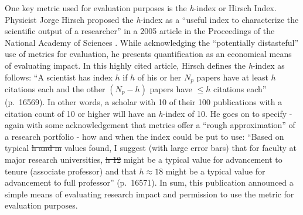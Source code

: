 \documentclass[
  10pt,
  letterpaper,
]{article}
\providecommand{\DIFaddtex}[1]{{\protect\color{blue}\uwave{#1}}} %
\providecommand{\DIFdeltex}[1]{{\protect\color{red}\sout{#1}}}                      %
\providecommand{\DIFaddbegin}{} %
\providecommand{\DIFaddend}{} %
\providecommand{\DIFdelbegin}{} %
\providecommand{\DIFdelend}{} %
\providecommand{\DIFadd}[1]{\texorpdfstring{\DIFaddtex{#1}}{#1}} %
\providecommand{\DIFdel}[1]{\texorpdfstring{\DIFdeltex{#1}}{}} %
\newcommand{\DIFscaledelfig}{0.5}
\newlength{\DIFdelgraphicswidth} %
\newlength{\DIFdelgraphicsheight} %
\newcommand{\DIFaddincludegraphics}[2][]{{\color{blue}\fbox{\DIFOincludegraphics[#1]{#2}}}} %
\newcommand{\DIFdelincludegraphics}[2][]{%
\sbox{\DIFdelgraphicsbox}{\DIFOincludegraphics[#1]{#2}}%
\settoboxwidth{\DIFdelgraphicswidth}{\DIFdelgraphicsbox} %
\settoboxtotalheight{\DIFdelgraphicsheight}{\DIFdelgraphicsbox} %
\scalebox{\DIFscaledelfig}{%
\parbox[b]{\DIFdelgraphicswidth}{\usebox{\DIFdelgraphicsbox}\\[-\baselineskip] \rule{\DIFdelgraphicswidth}{0em}}\llap{\resizebox{\DIFdelgraphicswidth}{\DIFdelgraphicsheight}{%
\setlength{\unitlength}{\DIFdelgraphicswidth}%
\begin{picture}(1,1)%
\thicklines\linethickness{2pt} %
{\color[rgb]{1,0,0}\put(0,0){\framebox(1,1){}}}%
{\color[rgb]{1,0,0}\put(0,0){\line( 1,1){1}}}%
{\color[rgb]{1,0,0}\put(0,1){\line(1,-1){1}}}%
\end{picture}%
}\hspace*{3pt}}} %
} %
\DeclareRobustCommand{\DIFaddbegin}{\DIFOaddbegin \let\includegraphics\DIFaddincludegraphics} %
\DeclareRobustCommand{\DIFaddend}{\DIFOaddend \let\includegraphics\DIFOincludegraphics} %
\DeclareRobustCommand{\DIFdelbegin}{\DIFOdelbegin \let\includegraphics\DIFdelincludegraphics} %
\DeclareRobustCommand{\DIFdelend}{\DIFOaddend \let\includegraphics\DIFOincludegraphics} %
\begin{document}
One key metric used for evaluation purposes is the \emph{h}-index or
Hirsch Index. Physicist Jorge Hirsch proposed the \emph{h}-index as a
``useful index to characterize the scientific output of a researcher''
in a 2005 article in the Proceedings of the National Academy of Sciences
\citep{hirsch_index_2005}. While acknowledging the ``potentially
distasteful'' use of metrics for evaluation, he presents quantification
as an economical means of evaluating impact. In this highly cited
article, Hirsch defines the \emph{h}-index as follows: ``A scientist has
index \(h\) if \(h\) of his or her \(N_p\) papers have at least \(h\)
citations each and the other \((N_p-h)\) papers have \(\le h\) citations
each'' (p.~16569). In other words, a scholar with 10 of their 100
publications with a citation count of 10 or higher will have an
\emph{h}-index of 10. He goes on to specify - again with some
acknowledgement that metrics offer a ``rough approximation'' of a
research portfolio - how and when the index could be put to use: ``Based
on typical \DIFdelbegin \DIFdel{h and m }\DIFdelend \DIFaddbegin \emph{\DIFadd{h}} \DIFadd{and }\emph{\DIFadd{m}} \DIFaddend values found, I suggest (with large
error bars) that for faculty at major research universities,
\DIFdelbegin \DIFdel{h 12 }\DIFdelend \DIFaddbegin \DIFadd{\(h \approx 12\) }\DIFaddend might be a typical value for advancement to tenure
(associate professor) and that \(h \approx 18\) might be a typical value
for advancement to full professor'' (p.~16571). In sum, this publication
announced a simple means of evaluating research impact and permission to
use the metric for evaluation purposes.
\end{document}
